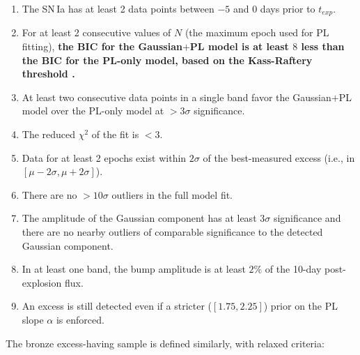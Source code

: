 \documentclass[twocolumn,twocolappendix, linenumbers]{aastex631} %
\begin{document}
\begin{enumerate}
    \item The SN\,Ia has at least 2 data points between $-5$ and 0 days prior to $t_{exp}$.
    \item For at least 2 consecutive values of $N$ (the maximum epoch used for PL fitting), {\bf the BIC for the Gaussian$+$PL model is at least $8$ less than the BIC for the PL-only model, based on the Kass-Raftery threshold \cite{kass1995bayes}.}
    \item At least two consecutive data points in a single band favor the Gaussian$+$PL model over the PL-only model at $>3\sigma$ significance.
    \item The reduced $\chi^2$ of the fit is $< 3$.
    \item Data for at least 2 epochs exist within $2\sigma$ of the best-measured excess (i.e., in $[\mu - 2\sigma, \mu + 2\sigma]$).
    \item There are no $>10\sigma$ outliers in the full model fit.
    \item The amplitude of the Gaussian component has at least $3\sigma$ significance and there are no nearby outliers of comparable significance to the detected Gaussian component.
    \item In at least one band, the bump amplitude is at least $2\%$ of the 10-day post-explosion flux.
    \item An excess is still detected even if a stricter ($[1.75, 2.25]$) prior on the PL slope $\alpha$ is enforced.
\end{enumerate}

The bronze excess-having sample is defined similarly, with relaxed criteria:
\end{document}
